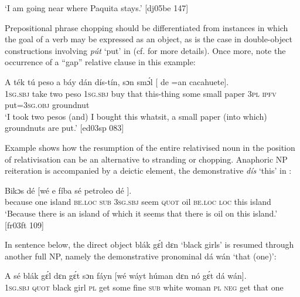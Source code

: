 \glt ‘I am going near where Paquita stays.’ [dj05be 147]
\z

Prepositional phrase chopping should be differentiated from instances in which the goal of a verb may be expressed as an object, as is the case in double-object constructions involving \textit{pút} ‘put’ in  (cf.  for more details). Once more, note the occurrence of a “gap” relative clause in this example: 


\ea%
    \label{ex:key:1444}
    \gll A    ték    tú  peso    a    báy  dán    dís-tín,  
sɔn    smɔ́l    [    de  =an    cacahuete].\\
\textsc{1sg.sbj}  take    two  peso    \textsc{1sg.sbj}  buy  that    this-thing
some  small  paper   3\textsc{pl}    \textsc{ipfv}  put=\textsc{3sg.obj}  groundnut\\

\glt ‘I took two pesos (and) I bought this whatsit, a small paper 
(into which) groundnuts are put.’ [ed03sp 083]
\z

Example  shows how the resumption of the entire relativised noun in the position of relativisation can be an alternative to stranding or chopping. Anaphoric \textsc{NP} reiteration is accompanied by a deictic element, the demonstrative \textit{dís} ‘this’ in :


\ea%
    \label{ex:key:1445}
    \gll Bikɔs       dé    [wé  e    fíba    sé
petroleo  dé        ].\\
because  one    island  \textsc{be.loc}   \textsc{sub}  \textsc{3sg.sbj}  seem  \textsc{quot}
oil    \textsc{be.loc}  \textsc{loc}  this  island\\
\glt ‘Because there is an island of which it seems that there is oil 
on this island.’ [fr03ft 109]
\z

In sentence  below, the direct object blák gɛ́l dɛn ‘black girls’ is resumed through another full NP, namely the demonstrative pronominal dá wán ‘that (one)’:


\ea%
    \label{ex:key:1446}
    \gll A    sé    blák    gɛ́l  dɛn  gɛ́t  sɔn    fáyn
[wé  wáyt  húman  dɛn nó  gɛ́t  dá  wán].\\
\textsc{1sg.sbj}  \textsc{quot}    black  girl  \textsc{pl}  get  some  fine  
 \textsc{sub}  white  woman  \textsc{pl}   \textsc{neg}  get  that  one\\

